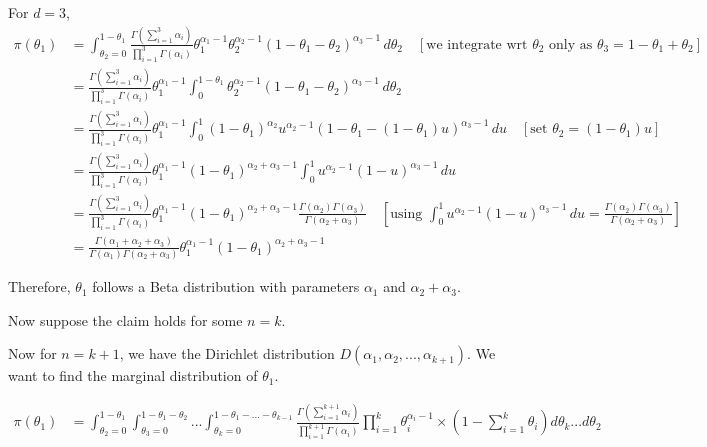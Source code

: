 \documentclass[a4paper]{article}
\begin{document}
For \(d = 3\),
\begin{align*}
    \pi(\theta_1) &= \int_{\theta_2 = 0}^{1-\theta_1} \frac{\Gamma(\sum_{i=1}^{3} \alpha_i)}{\prod_{i=1}^{3} \Gamma(\alpha_i)} \theta_1^{\alpha_1-1}\theta_2^{\alpha_2-1} (1 - \theta_1 - \theta_2)^{\alpha_3-1} \, d\theta_2\quad[\text{we integrate wrt \(\theta_2\) only as \(\theta_3 = 1 -\theta_1+\theta_2\)}]\\
    &= \frac{\Gamma(\sum_{i=1}^{3} \alpha_i)}{\prod_{i=1}^{3} \Gamma(\alpha_i)}\theta_1^{\alpha_1-1} \int_{0}^{1-\theta_1} \theta_2^{\alpha_2-1} (1- \theta_1 - \theta_2)^{\alpha_3-1} \, d\theta_2\\
    &=\frac{\Gamma(\sum_{i=1}^{3} \alpha_i)}{\prod_{i=1}^{3} \Gamma(\alpha_i)}\theta_1^{\alpha_1-1} \int_{0}^{1}  (1-\theta_1)^{\alpha_2} u^{\alpha_2 - 1}\left(1 - \theta_1 - (1-\theta_1) u\right)^{\alpha_3-1} \,du  \quad [\text{set }\theta_2 = (1 - \theta_1)u]\\
    &=\frac{\Gamma(\sum_{i=1}^{3} \alpha_i)}{\prod_{i=1}^{3} \Gamma(\alpha_i)}\theta_1^{\alpha_1-1}(1-\theta_1)^{\alpha_2+\alpha_3-1} \int_{0}^{1}   u^{\alpha_2 - 1}(1 - u)^{\alpha_3-1} \,du\\
    &= \frac{\Gamma(\sum_{i=1}^{3} \alpha_i)}{\prod_{i=1}^{3} \Gamma(\alpha_i)}\theta_1^{\alpha_1-1}(1-\theta_1)^{\alpha_2+\alpha_3-1} \frac{\Gamma(\alpha_2)\Gamma(\alpha_3)}{\Gamma(\alpha_2 + \alpha_3)} \quad \left[\text{using }\int_{0}^{1} u^{\alpha_2 - 1}(1 - u)^{\alpha_3-1} \,du = \frac{\Gamma(\alpha_2)\Gamma(\alpha_3)}{\Gamma(\alpha_2 + \alpha_3)}\right]\\
    &= \frac{\Gamma(\alpha_1 + \alpha_2 + \alpha_3)}{\Gamma(\alpha_1)\Gamma(\alpha_2 + \alpha_3)}\theta_1^{\alpha_1-1}(1-\theta_1)^{\alpha_2+\alpha_3-1} 
\end{align*}

Therefore, \(\theta_1\) follows a Beta distribution with parameters \(\alpha_1\) and \(\alpha_2 + \alpha_3\).

Now suppose the claim holds for some \(n = k\).

Now for \(n = k+1\), we have the Dirichlet distribution \(D(\alpha_1, \alpha_2, ..., \alpha_{k+1})\). We want to find the marginal distribution of \(\theta_1\).

\begin{align*}
    \pi(\theta_1) &= \int_{\theta_2=0}^{1-\theta_1} \int_{\theta_3=0}^{1-\theta_1-\theta_2} ... \int_{\theta_k=0}^{1-\theta_1-...-\theta_{k-1}} \frac{\Gamma(\sum_{i=1}^{k+1} \alpha_i)}{\prod_{i=1}^{k+1} \Gamma(\alpha_i)} \prod_{i=1}^{k} \theta_i^{\alpha_i - 1}\times\left(1 - \sum_{i=1}^{k}\theta_i\right) d\theta_k ... d\theta_2 
\end{align*}
\end{document}
